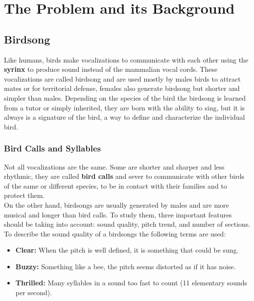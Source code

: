 \chapter{The Problem and its Background}\label{chap_problem_background}

\section{Birdsong}

Like humans, birds make vocalizations to communicate with each other using the \textbf{syrinx} to produce sound instead of the mammalian vocal cords. These vocalizations are called birdsong and are used mostly by males birds to attract mates or for territorial defense, females also generate birdsong but shorter and simpler than males. Depending on the species of the bird the birdsong is learned from a tutor or simply inherited, they are born with the ability to sing, but it is always is a signature of the bird, a way to define and characterize the individual bird. 



\subsection{Bird Calls and Syllables}

Not all vocalizations are the same. Some are shorter and sharper and less rhythmic, they are called \textbf{bird calls} and sever to communicate with other birds of the same or different species, to be in contact with their families and to protect them. \\

On the other hand, birdsongs are usually generated by males and are more musical and longer than bird calls. To study them, three important features should be taking into account: sound quality, pitch trend, and number of sections.\\

To describe the sound quality of a birdsongs the following terms are used:

\begin{itemize}
    \item \textbf{Clear:} When the pitch is well defined, it is something that could be sung.
    \item \textbf{Buzzy:} Something like a bee, the pitch seems distorted as if it has noise.
    \item \textbf{Thrilled:} Many syllables in a sound too fast to count (11 elementary sounds per second).
\end{itemize}

